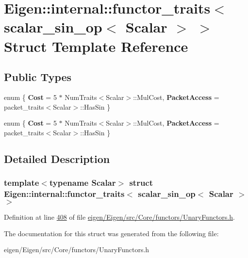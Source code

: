 \hypertarget{struct_eigen_1_1internal_1_1functor__traits_3_01scalar__sin__op_3_01_scalar_01_4_01_4}{}\section{Eigen\+:\+:internal\+:\+:functor\+\_\+traits$<$ scalar\+\_\+sin\+\_\+op$<$ Scalar $>$ $>$ Struct Template Reference}
\label{struct_eigen_1_1internal_1_1functor__traits_3_01scalar__sin__op_3_01_scalar_01_4_01_4}
\subsection*{Public Types}
\begin{DoxyCompactItemize}
\item 
\mbox{\label{struct_eigen_1_1internal_1_1functor__traits_3_01scalar__sin__op_3_01_scalar_01_4_01_4_a9c690c4f0ccd7a02ebc00269459390d5}} 
enum \{ {\bfseries Cost} = 5 $\ast$ Num\+Traits$<$Scalar$>$\+:\+:Mul\+Cost, 
{\bfseries Packet\+Access} = packet\+\_\+traits$<$Scalar$>$\+:\+:Has\+Sin
 \}
\item 
\mbox{\label{struct_eigen_1_1internal_1_1functor__traits_3_01scalar__sin__op_3_01_scalar_01_4_01_4_aee01c615cbc60676e59ba262e8f0b1c6}} 
enum \{ {\bfseries Cost} = 5 $\ast$ Num\+Traits$<$Scalar$>$\+:\+:Mul\+Cost, 
{\bfseries Packet\+Access} = packet\+\_\+traits$<$Scalar$>$\+:\+:Has\+Sin
 \}
\end{DoxyCompactItemize}


\subsection{Detailed Description}
\subsubsection*{template$<$typename Scalar$>$\newline
struct Eigen\+::internal\+::functor\+\_\+traits$<$ scalar\+\_\+sin\+\_\+op$<$ Scalar $>$ $>$}



Definition at line \hyperlink{eigen_2_eigen_2src_2_core_2functors_2_unary_functors_8h_source_l00408}{408} of file \hyperlink{eigen_2_eigen_2src_2_core_2functors_2_unary_functors_8h_source}{eigen/\+Eigen/src/\+Core/functors/\+Unary\+Functors.\+h}.



The documentation for this struct was generated from the following file\+:\begin{DoxyCompactItemize}
\item 
eigen/\+Eigen/src/\+Core/functors/\+Unary\+Functors.\+h\end{DoxyCompactItemize}
